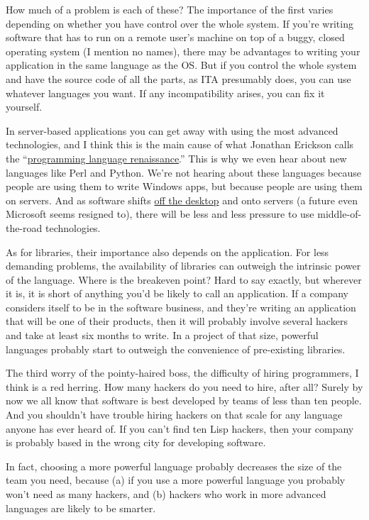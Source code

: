 How much of a problem is each of these? The importance of the first
varies depending on whether you have control over the whole system. If
you're writing software that has to run on a remote user's machine on
top of a buggy, closed operating system (I mention no names), there may
be advantages to writing your application in the same language as the
OS. But if you control the whole system and have the source code of all
the parts, as ITA presumably does, you can use whatever languages you
want. If any incompatibility arises, you can fix it yourself.

In server-based applications you can get away with using the most
advanced technologies, and I think this is the main cause of what
Jonathan Erickson calls the
``\href{http://www.byte.com/documents/s=1821/byt20011214s0003/}{programming
language renaissance}.'' This is why we even hear about new languages
like Perl and Python. We're not hearing about these languages because
people are using them to write Windows apps, but because people are
using them on servers. And as software shifts \href{road.html}{off the
desktop} and onto servers (a future even Microsoft seems resigned to),
there will be less and less pressure to use middle-of-the-road
technologies.

As for libraries, their importance also depends on the application. For
less demanding problems, the availability of libraries can outweigh the
intrinsic power of the language. Where is the breakeven point? Hard to
say exactly, but wherever it is, it is short of anything you'd be likely
to call an application. If a company considers itself to be in the
software business, and they're writing an application that will be one
of their products, then it will probably involve several hackers and
take at least six months to write. In a project of that size, powerful
languages probably start to outweigh the convenience of pre-existing
libraries.

The third worry of the pointy-haired boss, the difficulty of hiring
programmers, I think is a red herring. How many hackers do you need to
hire, after all? Surely by now we all know that software is best
developed by teams of less than ten people. And you shouldn't have
trouble hiring hackers on that scale for any language anyone has ever
heard of. If you can't find ten Lisp hackers, then your company is
probably based in the wrong city for developing software.

In fact, choosing a more powerful language probably decreases the size
of the team you need, because (a) if you use a more powerful language
you probably won't need as many hackers, and (b) hackers who work in
more advanced languages are likely to be smarter.

